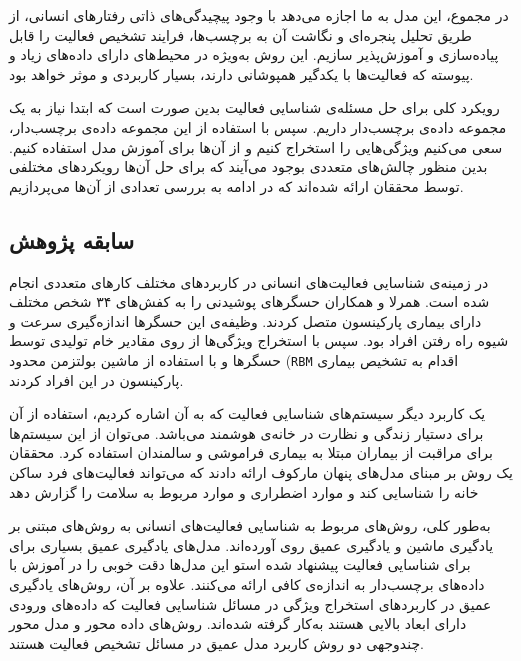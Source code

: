 در مجموع، این مدل به ما اجازه می‌دهد با وجود پیچیدگی‌های ذاتی رفتارهای انسانی، از طریق تحلیل پنجره‌ای و نگاشت آن به برچسب‌ها، فرایند تشخیص فعالیت را قابل پیاده‌سازی و آموزش‌پذیر سازیم. این روش به‌ویژه در محیط‌های دارای داده‌های زیاد و پیوسته که فعالیت‌ها با یکدگیر همپوشانی دارند، بسیار کاربردی و موثر خواهد بود.

رویکرد کلی برای حل مسئله‌ی شناسایی فعالیت بدین صورت است که ابتدا نیاز به یک مجموعه داده‌ی
برچسب‌دار داریم. سپس با استفاده از این مجموعه داده‌ی برچسب‌دار، سعی می‌کنیم ویژگی‌هایی را استخراج کنیم و از آن‌ها برای آموزش مدل استفاده کنیم. بدین منظور چالش‌های متعددی بوجود می‌آیند که برای حل آن‌ها رویکردهای مختلفی توسط محققان ارائه شده‌اند که در ادامه به بررسی تعدادی از آن‌ها می‌پردازیم.

\subsection{سابقه پژوهش}

در زمینه‌ی شناسایی فعالیت‌های انسانی در کاربردهای مختلف کارهای متعددی انجام شده است. همرلا و همکاران\cite{hammerla2015pd}
حسگرهای پوشیدنی را به کفش‌های ۳۴ شخص مختلف دارای بیماری
پارکینسون
متصل کردند. وظیفه‌ی این حسگرها اندازه‌گیری سرعت و شیوه راه رفتن افراد بود. سپس با استخراج ویژگی‌ها از روی مقادیر خام تولیدی توسط حسگرها و با استفاده از
ماشین بولتزمن محدود (\verb|RBM|
اقدام به تشخیص بیماری پارکینسون در این افراد کردند.

یک کاربرد دیگر سیستم‌های شناسایی فعالیت که به آن اشاره کردیم، استفاده از آن برای دستیار زندگی و نظارت در خانه‌ی هوشمند می‌باشد. می‌توان از این سیستم‌ها برای مراقبت از بیماران مبتلا به
بیماری فراموشی و سالمندان استفاده کرد. محققان یک روش بر مبنای
مدل‌های پنهان مارکوف
ارائه دادند که می‌تواند فعالیت‌های فرد ساکن خانه را شناسایی کند و موارد اضطراری و موارد مربوط به سلامت را گزارش دهد\cite{asghari2018activity}

به‌طور کلی، روش‌های مربوط به شناسایی فعالیت‌های انسانی به روش‌های مبتنی بر یادگیری ماشین و یادگیری عمیق روی آورده‌اند. مدل‌های یادگیری عمیق بسیاری برای برای شناسایی فعالیت پیشنهاد شده استو این مدل‌ها دقت خوبی را در آموزش با داده‌های برچسب‌دار به اندازه‌ی کافی
ارائه می‌کنند\cite{cook2013transfer}.
علاوه بر آن، روش‌های یادگیری عمیق در کاربردهای استخراج ویژگی در مسائل شناسایی فعالیت که داده‌های ورودی دارای ابعاد بالایی هستند به‌کار گرفته شده‌اند. روش‌های
داده محور\cite{chen2015deep}
و مدل محور چندوجهی\cite{ha2015multi}
دو روش کاربرد مدل عمیق در مسائل تشخیص فعالیت هستند.

